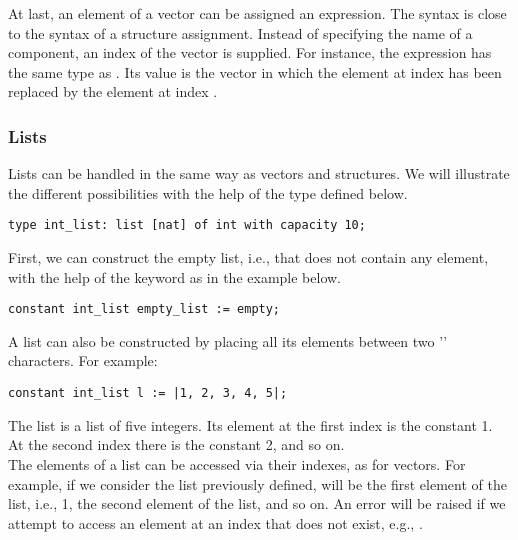  At last, an
element of a vector can be assigned an expression.  The syntax is
close to the syntax of a structure assignment.  Instead of specifying
the name of a component, an index of the vector is supplied.  For
instance, the expression  has
the same type as .  Its value is the vector  in which the
element at index  has been replaced by the element at
index .\\

\vectordef



\subsubsection{Lists}
Lists can be handled in the same way as vectors and structures.  We
will illustrate the different possibilities with the help of the type
 defined below.
\begin{lstlisting}
type int_list: list [nat] of int with capacity 10;
\end{lstlisting}

 First, we can construct
the empty list, i.e., that does not contain any element, with the help
of the keyword  as in the example below.
\begin{lstlisting}
constant int_list empty_list := empty;
\end{lstlisting}

 A list can also be
constructed by placing all its elements between two '\LS{|}'
characters.  For example:
\begin{lstlisting}
constant int_list l := |1, 2, 3, 4, 5|;
\end{lstlisting}
The list  is a list of five integers.  Its element at the first
index is the constant 1.  At the second index there is the constant 2,
and so on.\\

 The elements of a
list can be accessed via their indexes, as for vectors.  For example,
if we consider the list  previously defined,  will be
the first element of the list, i.e., 1,  the second element
of the list, and so on.  An error will be raised if we attempt to
access an element at an index that does not exist, e.g., .

